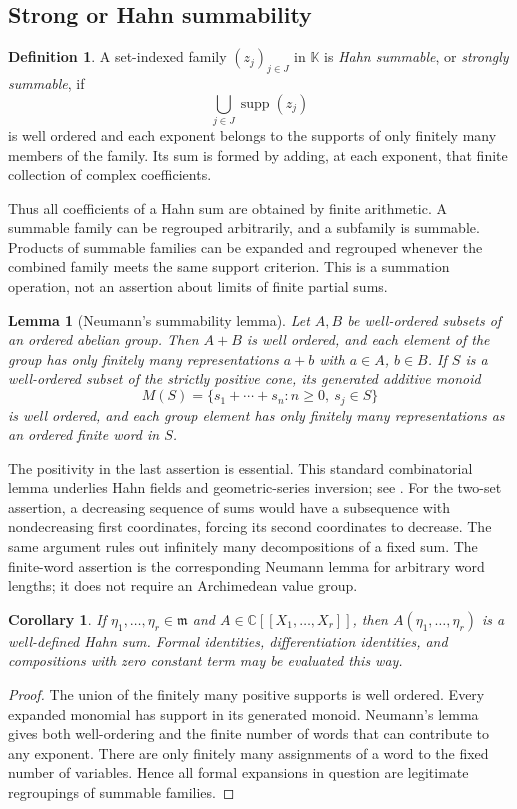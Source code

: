 \documentclass[11pt,a4paper]{article}
\numberwithin{equation}{section}
\newtheorem{lemma}[theorem]{Lemma}
\newtheorem{corollary}[theorem]{Corollary}
\theoremstyle{definition}
\newtheorem{definition}[theorem]{Definition}
\newcommand{\K}{\mathbb K}
\newcommand{\C}{\mathbb C}
\newcommand{\mm}{\mathfrak m}
\newcommand{\supp}{\operatorname{supp}}
\begin{document}
\subsection{Strong or Hahn summability}

\begin{definition}\label{def:summable}
A set-indexed family $(z_j)_{j\in J}$ in $\K$ is \emph{Hahn summable}, or
\emph{strongly summable}, if
\[
 \bigcup_{j\in J}\supp(z_j)
\]
is well ordered and each exponent belongs to the supports of only finitely
many members of the family. Its sum is formed by adding, at each exponent,
that finite collection of complex coefficients.
\end{definition}

Thus all coefficients of a Hahn sum are obtained by finite arithmetic.
A summable family can be regrouped arbitrarily, and a subfamily is summable.
Products of summable families can be expanded and regrouped whenever the
combined family meets the same support criterion. This is a summation
operation, not an assertion about limits of finite partial sums.

\begin{lemma}[Neumann's summability lemma]\label{lem:neumann}
Let $A,B$ be well-ordered subsets of an ordered abelian group. Then $A+B$ is
well ordered, and each element of the group has only finitely many
representations $a+b$ with $a\in A$, $b\in B$. If $S$ is a well-ordered subset
of the strictly positive cone, its generated additive monoid
\[
 M(S)=\{s_1+\cdots+s_n:n\geq0,\ s_j\in S\}
\]
is well ordered, and each group element has only finitely many representations
as an ordered finite word in $S$.
\end{lemma}

The positivity in the last assertion is essential. This standard
combinatorial lemma underlies Hahn fields and geometric-series inversion;
see \cite{Neumann,MS}. For the two-set assertion, a decreasing sequence of sums
would have a subsequence with nondecreasing first coordinates, forcing its
second coordinates to decrease. The same argument rules out infinitely many
decompositions of a fixed sum. The finite-word assertion is the corresponding
Neumann lemma for arbitrary word lengths; it does not require an Archimedean
value group.

\begin{corollary}\label{cor:infseries}
If $\eta_1,\ldots,\eta_r\in\mm$ and
$A\in\C[[X_1,\ldots,X_r]]$, then $A(\eta_1,\ldots,\eta_r)$ is a well-defined
Hahn sum. Formal identities, differentiation identities, and compositions
with zero constant term may be evaluated this way.
\end{corollary}
\begin{proof}
The union of the finitely many positive supports is well ordered. Every
expanded monomial has support in its generated monoid. Neumann's lemma gives
both well-ordering and the finite number of words that can contribute to
any exponent. There are only finitely many assignments of a word to the
fixed number of variables. Hence all formal expansions in question are
legitimate regroupings of summable families.
\end{proof}
\end{document}
